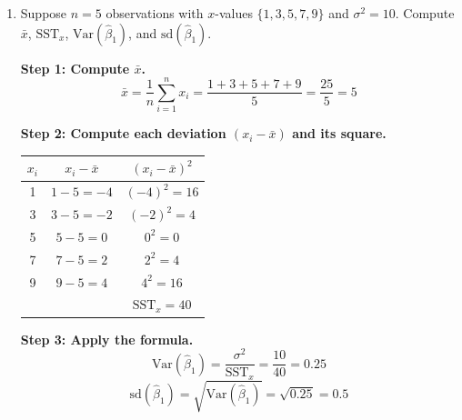 \documentclass[11pt,a4paper]{article}
\begin{document}
\begin{enumerate}[label=(\alph*)]
\begin{solution}
\medskip
\textbf{Summary of assumptions used:}
\begin{itemize}[itemsep=2pt]
  \item \textbf{SLR.1} (Linear in Parameters): $\beta_1$ is a constant, so it drops from the variance.
  \item \textbf{SLR.2} (Random Sampling): errors are independent, so covariance terms are zero.
  \item \textbf{SLR.3} (Sample Variation): $\text{SST}_x > 0$, so division is valid.
  \item \textbf{SLR.5} (Homoskedasticity): all $\text{Var}(u_i \mid \mathbf{x}) = \sigma^2$, so $\sigma^2$ factors out.
\end{itemize}
Note: SLR.4 (Zero Conditional Mean) is \emph{not} needed for the variance formula --- it was needed for unbiasedness but not here.
\end{solution}

\item Suppose $n = 5$ observations with $x$-values $\{1, 3, 5, 7, 9\}$ and $\sigma^2 = 10$. Compute $\bar{x}$, $\text{SST}_x$, $\text{Var}(\hat{\beta}_1)$, and $\text{sd}(\hat{\beta}_1)$.

\begin{solution}
\textbf{Step 1: Compute $\bar{x}$.}
\[
  \bar{x} = \frac{1}{n}\sum_{i=1}^n x_i = \frac{1 + 3 + 5 + 7 + 9}{5} = \frac{25}{5} = 5
\]

\textbf{Step 2: Compute each deviation $(x_i - \bar{x})$ and its square.}

\medskip
\begin{center}
\begin{tabular}{ccc}
\toprule
$x_i$ & $x_i - \bar{x}$ & $(x_i - \bar{x})^2$ \\
\midrule
1 & $1 - 5 = -4$ & $(-4)^2 = 16$ \\
3 & $3 - 5 = -2$ & $(-2)^2 = 4$ \\
5 & $5 - 5 = 0$  & $0^2 = 0$ \\
7 & $7 - 5 = 2$  & $2^2 = 4$ \\
9 & $9 - 5 = 4$  & $4^2 = 16$ \\
\midrule
  &  & $\text{SST}_x = 40$ \\
\bottomrule
\end{tabular}
\end{center}

\textbf{Step 3: Apply the formula.}
\[
  \text{Var}(\hat{\beta}_1)
  = \frac{\sigma^2}{\text{SST}_x}
  = \frac{10}{40}
  = \boxed{0.25}
\]
\[
  \text{sd}(\hat{\beta}_1)
  = \sqrt{\text{Var}(\hat{\beta}_1)}
  = \sqrt{0.25}
  = \boxed{0.5}
\]


\end{solution}
\end{enumerate}
\end{document}
